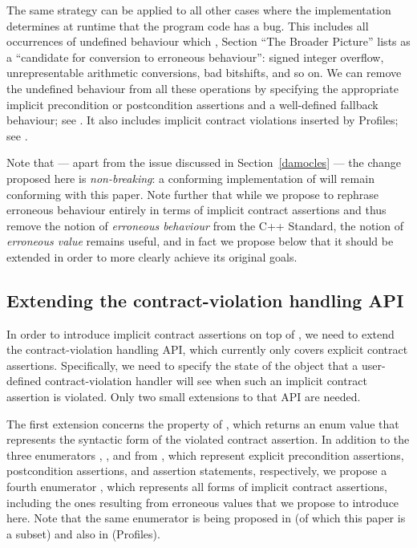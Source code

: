 The same strategy can be applied to all other cases where the implementation determines at runtime that the program code has a bug. This includes all occurrences of undefined behaviour which \cite{P2795R5}, Section ``The Broader Picture'' lists as a ``candidate for conversion to erroneous behaviour'': signed integer overflow, unrepresentable arithmetic conversions, bad bitshifts, and so on. We can remove the undefined behaviour from all these operations by specifying the appropriate implicit precondition or postcondition assertions and a well-defined fallback behaviour; see \cite{P3100R1}. It also includes implicit contract violations inserted by Profiles; see \cite{P3081R1}.

Note that --- apart from the issue discussed in Section~\ref{damocles} --- the change proposed here is \emph{non-breaking}: a conforming implementation of \cite{P2795R5} will remain conforming with this paper. Note further that while we propose to rephrase erroneous behaviour entirely in terms of implicit contract assertions and thus remove the notion of \emph{erroneous behaviour} from the C++ Standard, the notion of \emph{erroneous value} remains useful, and in fact we propose below that it should be extended in order to more clearly achieve its original goals.

\subsection{Extending the contract-violation handling API}

In order to introduce implicit contract assertions on top of \cite{P2900R13}, we need to extend the contract-violation handling API, which currently only covers explicit contract assertions. Specifically, we need to specify the state of the \mbox{} object that a user-defined contract-violation handler will see when such an implicit contract assertion is violated. Only two small extensions to that API are needed. 

The first extension concerns the  property of , which returns an enum value that represents the syntactic form of the violated contract assertion. In addition to the three enumerators , , and  from \cite{P2900R13}, which represent explicit precondition assertions, postcondition assertions, and assertion statements, respectively, we propose a fourth enumerator , which represents all forms of implicit contract assertions, including the ones resulting from erroneous values that we propose to introduce here. Note that the same enumerator is being proposed in \cite{P3100R1} (of which this paper is a subset) and also in \cite{P3081R1} (Profiles).

